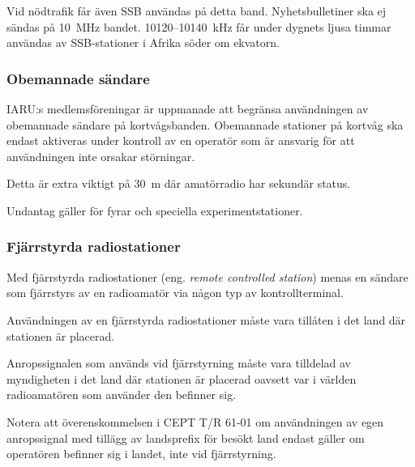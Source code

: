Vid nödtrafik får även SSB användas på detta band.
Nyhetsbulletiner ska ej sändas på 10~MHz bandet.
10120--10140~kHz får under dygnets ljusa timmar användas av
SSB-stationer i Afrika söder om ekvatorn.

\subsubsection{Obemannade sändare}

IARU:s medlemsföreningar är uppmanade att begränsa användningen av obemannade
sändare på kortvågsbanden.
Obemannade stationer på kortvåg ska endast aktiveras under kontroll av en
operatör som är ansvarig för att användningen inte orsakar störningar.

Detta är extra viktigt på 30~m där amatörradio har sekundär status.

Undantag gäller för fyrar och speciella experimentstationer.

\subsubsection{Fjärrstyrda radiostationer}

Med fjärrstyrda radiostationer (eng. \emph{remote controlled station}) menas en
sändare som fjärrstyrs av en radioamatör via någon typ av kontrollterminal.

Användningen av en fjärrstyrda radiostationer måste vara tillåten i det land där
stationen är placerad.

Anropssignalen som används vid fjärrstyrning måste vara tilldelad av myndigheten
i det land där stationen är placerad oavsett var i världen radioamatören som
använder den befinner sig.

Notera att överenskommelsen i CEPT T/R 61-01 \cite{TR6101} om användningen av
egen anropssignal med tillägg av landsprefix för besökt land endast gäller om
operatören befinner sig i landet, inte vid fjärrstyrning.
